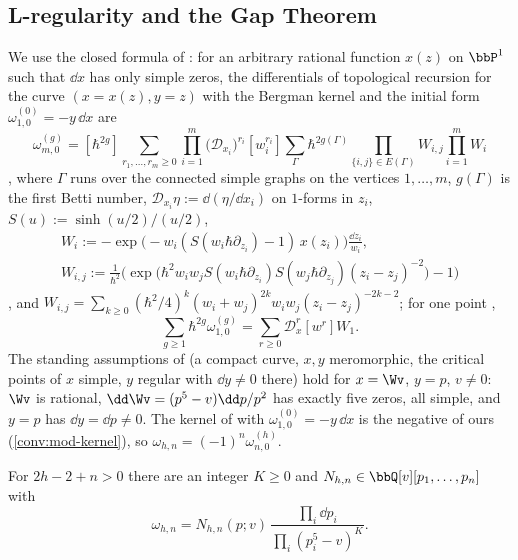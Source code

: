 \subsection{L-regularity and the Gap Theorem}
\label{sec:mod-Lreg}

We use the closed formula of \cite[Thm.~7.1]{ABDKS25}: for an arbitrary rational function $x(z)$ on $\bbP^1$ such that $\dd x$ has only simple zeros, the differentials of topological recursion for the curve $(x=x(z),y=z)$ with the Bergman kernel and the initial form $\omega^{(0)}_{1,0}=-y\,\dd x$ are
\begin{equation}
\label{eq:mod-abdks}
\omega^{(g)}_{m,0}=[\hbar^{2g}]\sum_{r_1,\dots,r_m\geq 0}\prod_{i=1}^m\big(\mathcal D_{x_i}\big)^{r_i}[w_i^{r_i}]\sum_{\Gamma}\hbar^{2g(\Gamma)}\prod_{\{i,j\}\in E(\Gamma)}W_{i,j}\prod_{i=1}^mW_i
\end{equation}
\cite[(7.9)]{ABDKS25}, where $\Gamma$ runs over the connected simple graphs on the vertices $1,\dots,m$, $g(\Gamma)$ is the first Betti number, $\mathcal D_{x_i}\eta:=\dd(\eta/\dd x_i)$ on $1$-forms in $z_i$, $S(u):=\sinh(u/2)/(u/2)$,
\begin{gather*}
W_i:=-\exp\!\big(-w_i(S(w_i\hbar\partial_{z_i})-1)\,x(z_i)\big)\frac{\dd z_i}{w_i},\\
W_{i,j}:=\frac{1}{\hbar^2}\Big(\exp\!\big(\hbar^2w_iw_jS(w_i\hbar\partial_{z_i})S(w_j\hbar\partial_{z_j})(z_i-z_j)^{-2}\big)-1\Big)
\end{gather*}
\cite[(7.6), (7.7)]{ABDKS25}, and $W_{i,j}=\sum_{k\geq 0}(\hbar^2/4)^k(w_i+w_j)^{2k}w_iw_j(z_i-z_j)^{-2k-2}$; for one point \cite[(7.10)]{ABDKS25},
\begin{equation}
\label{eq:mod-710}
\sum_{g\geq 1}\hbar^{2g}\omega^{(g)}_{1,0}=\sum_{r\geq 0}\mathcal D_x^r[w^r]W_1 .
\end{equation}
The standing assumptions of \cite[\S1.1]{ABDKS25} (a compact curve, $x,y$ meromorphic, the critical points of $x$ simple, $y$ regular with $\dd y\neq 0$ there) hold for $x=\Wv$, $y=p$, $v\neq 0$: $\Wv$ is rational, $\dd\Wv=(p^5-v)\dd p/p^2$ has exactly five zeros, all simple, and $y=p$ has $\dd y=\dd p\neq 0$. The kernel of \cite[(1.1)]{ABDKS25} with $\omega^{(0)}_{1,0}=-y\,\dd x$ is the negative of ours (\cref{conv:mod-kernel}), so $\omega_{h,n}=(-1)^n\omega^{(h)}_{n,0}$.

\begin{lem}
\label{lem:mod-abdks}
For $2h-2+n>0$ there are an integer $K\geq 0$ and $N_{h,n}\in\bbQ[v][p_1,\dots,p_n]$ with
\[
\omega_{h,n}=N_{h,n}(p;v)\,\frac{\prod_i\dd p_i}{\prod_i(p_i^5-v)^K}.
\]
\end{lem}

